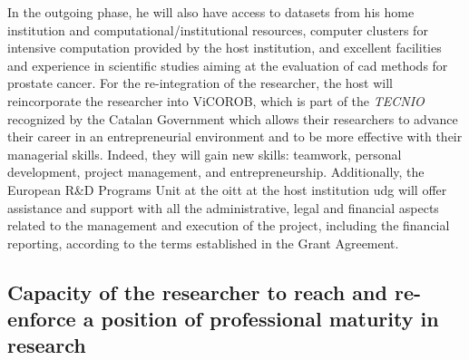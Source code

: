 In the outgoing phase, he will also have access to datasets from his home institution and computational/institutional resources, computer clusters for intensive computation provided by the host institution, and excellent facilities and experience in scientific studies aiming at the evaluation of \ac{cad} methods for prostate cancer. 
For the re-integration of the researcher, the host will reincorporate the researcher into ViCOROB, which is part of the \emph{TECNIO} recognized by the Catalan Government which allows their researchers to advance their career in an entrepreneurial environment and to be more effective with their managerial skills.
Indeed, they will gain new skills: teamwork, personal development, project management, and entrepreneurship.
Additionally, the European R\&D Programs Unit at the \ac{oitt} at the host institution \ac{udg} will offer assistance and support with all the administrative, legal and financial aspects related to the management and execution of the project, including the financial reporting, according to the terms established in the Grant Agreement.


\subsection{Capacity of the researcher to reach and re-enforce a position of professional maturity in research}
\label{sec:maturity}

